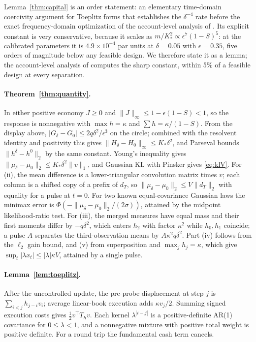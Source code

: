\documentclass[12pt]{article}
\theoremstyle{definition}
\theoremstyle{remark}
\begin{document}
Lemma~\ref{thm:capital} is an order statement: an elementary time-domain coercivity argument for Toeplitz forms that establishes the $\delta^{-4}$ rate before the exact frequency-domain optimization of the account-level analysis of \citet{niroula2026a}. Its explicit constant is very conservative, because it scales as $m/K_*^2\propto\epsilon^7(1-S)^5$: at the calibrated parameters it is $4.9\times10^{-4}$ par units at $\delta=0.05$ with $\epsilon=0.35$, five orders of magnitude below any feasible design. We therefore state it as a lemma; the account-level analysis of \citet{niroula2026a} computes the sharp constant, within 5\% of a feasible design at every separation.

\paragraph{Theorem~\ref{thm:quantity}.} In either positive economy $J\ge0$ and $\|J\|_\infty\le1-\epsilon(1-S)<1$, so the response is nonnegative with $\max h=\kappa$ and $\sum h=\kappa/(1-S)$. From the display above, $|G_\delta-G_0|\le2q\delta^2/\epsilon^3$ on the circle; combined with the resolvent identity and positivity this gives $\|H_\delta-H_0\|_\infty\le K_*\delta^2$, and Parseval bounds $\|h^\delta-h^0\|_2$ by the same constant. Young's inequality gives $\|\mu_\delta-\mu_0\|_2\le K_*\delta^2\|v\|_1$, and Gaussian KL with Pinsker gives \eqref{eq:klV}. For (ii), the mean difference is a lower-triangular convolution matrix times $v$; each column is a shifted copy of a prefix of $d_T$, so $\|\mu_\delta-\mu_0\|_2\le V\|d_T\|_2$ with equality for a pulse at $t=0$. For two known equal-covariance Gaussian laws the minimax error is $\Phi(-\|\mu_\delta-\mu_0\|_2/(2\sigma))$, attained by the midpoint likelihood-ratio test. For (iii), the merged measures have equal mass and their first moments differ by $-q\delta^2$, which enters $h_2$ with factor $\kappa^2$ while $h_0,h_1$ coincide; a pulse $A$ separates the third-observation means by $A\kappa^2q\delta^2$. Part (iv) follows from the $\ell_2$ gain bound, and (v) from superposition and $\max_jh_j=\kappa$, which give $\sup_t|\lambda x_t|\le|\lambda|\kappa V$, attained by a single pulse.


\paragraph{Lemma~\ref{lem:toeplitz}.} After the uncontrolled update, the pre-probe displacement at step $j$ is $\sum_{i<j}h_{j-i}v_i$; average linear-book execution adds $\kappa v_j/2$. Summing signed execution costs gives $\tfrac12v^\top T_hv$. Each kernel $\lambda^{|i-j|}$ is a positive-definite AR(1) covariance for $0\le\lambda<1$, and a nonnegative mixture with positive total weight is positive definite. For a round trip the fundamental cash term cancels.
\end{document}
